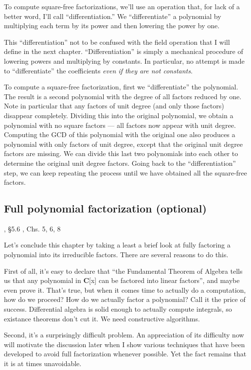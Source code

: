 To compute square-free factorizations, we'll use an operation that,
for lack of a better word, I'll call ``differentiation.''  We
``differentiate'' a polynomial by multiplying each term by its power
and then lowering the power by one.

This ``differentiation'' not to be confused with the field operation
that I will define in the next chapter.  ``Differentiation'' is simply
a mechanical procedure of lowering powers and multiplying by
constants.  In particular, no attempt is made to ``differentiate''
the coefficients {\it even if they are not constants}.

To compute a square-free factorization, first we ``differentiate'' the
polynomial.  The result is a second polynomial with the degree of all
factors reduced by one.  Note in particular that any factors of unit
degree (and only those factors) disappear completely.  Dividing this
into the original polynomial, we obtain a polynomial with no square
factors --- all factors now appear with unit degree.  Computing the
GCD of this polynomial with the original one also produces a
polynomial with only factors of unit degree, except that the original
unit degree factors are missing.  We can divide this last two
polynomials into each other to determine the original unit degree
factors.  Going back to the ``differentiation'' step, we can keep
repeating the process until we have obtained all the square-free
factors.


\subsection*{Full polynomial factorization (optional)}

, \S5.6
\hbox{}\qquad [Ge92], Chs. 5, 6, 8

Let's conclude this chapter by taking a least a brief look at fully
factoring a polynomial into its irreducible factors.  There are
several reasons to do this.

First of all, it's easy to declare that ``the Fundamental Theorem of
Algebra tells us that any polynomial in {\bf C}[x] can be factored
into linear factors'', and maybe even prove it.  That's true, but when it comes
time to actually do a computation, how do we proceed?  How do we
actually factor a polynomial?  Call it the price of success.
Differential algebra is solid enough to actually compute integrals, so
existance theorems don't cut it.  We need constructive algorithms.

Second, it's a surprisingly difficult problem.  An appreciation of its
difficulty now will motivate the discussion later when I show various
techniques that have been developed to avoid full factorization
whenever possible.  Yet the fact remains that it is at times
unavoidable.

